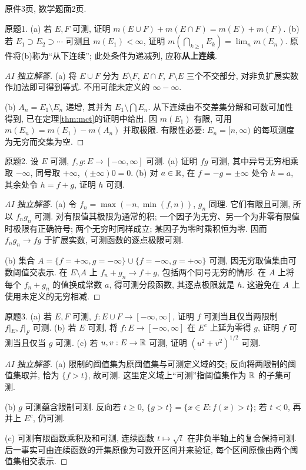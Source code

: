 \label{sec:ps05}
原件3页, 数学题面2页.
\begin{exercise}\label{ps05:1}
原题1. (a) 若 $E,F$ 可测, 证明 $m(E\cup F)+m(E\cap F)=m(E)+m(F)$. (b) 若 $E_1\supset E_2\supset\cdots$ 可测且 $m(E_1)<\infty$, 证明 $m(\bigcap_{k\ge1}E_k)=\lim_n m(E_n)$. 原件将(b)称为“从下连续”; 此处条件为递减列, 应称\textbf{从上连续}.
\end{exercise}
\begin{proof}[AI 独立解答]
(a) 将 $E\cup F$ 分为 $E\setminus F$, $E\cap F$, $F\setminus E$ 三个不交部分, 对非负扩展实数作加法即可得到等式. 不用可能未定义的 $\infty-\infty$.

(b) $A_n=E_1\setminus E_n$ 递增, 其并为 $E_1\setminus\bigcap E_n$. 从下连续由不交差集分解和可数可加性得到, 已在定理\ref{thm:mct}的证明中给出. 因 $m(E_1)$ 有限, 可用 $m(E_n)=m(E_1)-m(A_n)$ 并取极限. 有限性必要: $E_n=[n,\infty)$ 的每项测度为无穷而交集为空.
\end{proof}
\begin{exercise}\label{ps05:2}
原题2. 设 $E$ 可测, $f,g:E\to[-\infty,\infty]$ 可测. (a) 证明 $fg$ 可测, 其中异号无穷相乘取 $-\infty$, 同号取 $+\infty$, $(\pm\infty)0=0$. (b) 对 $a\in\mathbb R$, 在 $f=-g=\pm\infty$ 处令 $h=a$, 其余处令 $h=f+g$, 证明 $h$ 可测.
\end{exercise}
\begin{proof}[AI 独立解答]
(a) 令 $f_n=\max(-n,\min(f,n))$, $g_n$ 同理. 它们有限且可测, 所以 $f_ng_n$ 可测. 对有限值其极限为通常的积; 一个因子为无穷、另一个为非零有限值时极限有正确符号; 两个无穷时同样成立; 某因子为零时乘积恒为零. 因而 $f_ng_n\to fg$ 于扩展实数, 可测函数的逐点极限可测.

(b) 集合 $A=\{f=+\infty,g=-\infty\}\cup\{f=-\infty,g=+\infty\}$ 可测, 因无穷取值集由可数阈值交表示. 在 $E\setminus A$ 上 $f_n+g_n\to f+g$, 包括两个同号无穷的情形. 在 $A$ 上将每个 $f_n+g_n$ 的值换成常数 $a$, 得可测分段函数, 其逐点极限就是 $h$. 这避免在 $A$ 上使用未定义的无穷相减.
\end{proof}
\begin{exercise}\label{ps05:3}
原题3. (a) 若 $E,F$ 可测, $f:E\cup F\to[-\infty,\infty]$, 证明 $f$ 可测当且仅当两限制 $f|_E,f|_F$ 可测. (b) 若 $E$ 可测, 将 $f:E\to[-\infty,\infty]$ 在 $E^c$ 上延为零得 $g$, 证明 $f$ 可测当且仅当 $g$ 可测. (c) 若 $u,v:E\to\mathbb R$ 可测, 证明 $(u^2+v^2)^{1/2}$ 可测.
\end{exercise}
\begin{proof}[AI 独立解答]
(a) 限制的阈值集为原阈值集与可测定义域的交; 反向将两限制的阈值集取并, 恰为 $\{f>t\}$, 故可测. 这里定义域上“可测”指阈值集作为 $\mathbb R$ 的子集可测.

(b) $g$ 可测蕴含限制可测. 反向若 $t\ge0$, $\{g>t\}=\{x\in E:f(x)>t\}$; 若 $t<0$, 再并上 $E^c$, 仍可测.

(c) 可测有限函数乘积及和可测, 连续函数 $t\mapsto\sqrt t$ 在非负半轴上的复合保持可测. 后一事实可由连续函数的开集原像为可数开区间并来验证, 每个区间原像由两个阈值集相交表示.
\end{proof}
